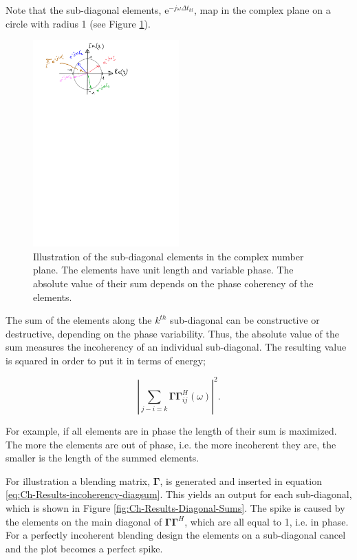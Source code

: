 Note that the sub-diagonal elements, $\mathrm{e}^{-j \omega \Delta t_{kl}}$, map in the complex plane on a circle with radius 1 (see Figure \ref{fig:Ch-Results-complex-circle}). 

\begin{figure}
	\centering
	\includegraphics[width = 0.5\textwidth]{Plots/complex-circle}
	\caption{Illustration of the sub-diagonal elements in the complex number plane. The elements have unit length and variable phase. The absolute value of their sum depends on the phase coherency of the elements.}
	\label{fig:Ch-Results-complex-circle}
\end{figure}

The sum of the elements along the $k^{th}$ sub-diagonal can be constructive or destructive, depending on the phase variability. Thus, the absolute value of the sum measures the incoherency of an individual sub-diagonal. The resulting value is squared in order to put it in terms of energy;

\begin{equation}
	\left| \sum_{j-i=k} \mathbf{\Gamma \Gamma}^H_{ij} (\omega) \right|^2.
	\label{eq:Ch-Results-incoherency-diagsum}	
\end{equation} 

For example, if all elements are in phase the length of their sum is maximized. The more the elements are out of phase, i.e. the more incoherent they are, the smaller is the length of the summed elements. 

For illustration a blending matrix, $\mathbf{\Gamma}$, is generated and inserted in equation \ref{eq:Ch-Results-incoherency-diagsum}. This yields an output for each sub-diagonal, which is shown in Figure \ref{fig:Ch-Results-Diagonal-Sums}. The spike is caused by the elements on the main diagonal of $\mathbf{\Gamma \Gamma}^H$, which are all equal to 1, i.e. in phase. For a perfectly incoherent blending design the elements on a sub-diagonal cancel and the plot becomes a perfect spike. 


